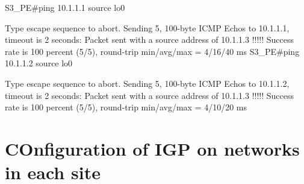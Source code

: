 \documentclass[10pt]{article}
\begin{document}
\begin{itemize}
\begin{verbatim*}
		S3_PE#ping 10.1.1.1 source lo0

		Type escape sequence to abort.
		Sending 5, 100-byte ICMP Echos to 10.1.1.1, timeout is 2 seconds:
		Packet sent with a source address of 10.1.1.3 
		!!!!!
		Success rate is 100 percent (5/5), round-trip min/avg/max = 4/16/40 ms
		S3_PE#ping 10.1.1.2 source lo0

		Type escape sequence to abort.
		Sending 5, 100-byte ICMP Echos to 10.1.1.2, timeout is 2 seconds:
		Packet sent with a source address of 10.1.1.3 
		!!!!!
		Success rate is 100 percent (5/5), round-trip min/avg/max = 4/10/20 ms
	\end{verbatim*}
\end{itemize}
\section{COnfiguration of IGP on networks in each site} %
\label{sec:configuration_of_igp_on_networks_in_each_site}
\end{document}
